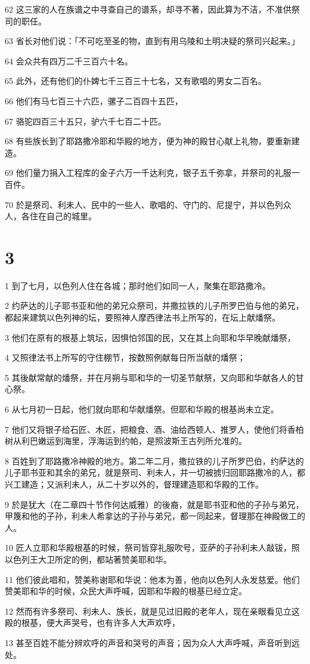 \par 62 这三家的人在族谱之中寻查自己的谱系，却寻不著，因此算为不洁，不准供祭司的职任。
\par 63 省长对他们说：「不可吃至圣的物，直到有用乌陵和土明决疑的祭司兴起来。」
\par 64 会众共有四万二千三百六十名。
\par 65 此外，还有他们的仆婢七千三百三十七名，又有歌唱的男女二百名。
\par 66 他们有马七百三十六匹，骡子二百四十五匹，
\par 67 骆驼四百三十五只，驴六千七百二十匹。
\par 68 有些族长到了耶路撒冷耶和华殿的地方，便为神的殿甘心献上礼物，要重新建造。
\par 69 他们量力捐入工程库的金子六万一千达利克，银子五千弥拿，并祭司的礼服一百件。
\par 70 於是祭司、利未人、民中的一些人、歌唱的、守门的、尼提宁，并以色列众人，各住在自己的城里。

\chapter{3}

\par 1 到了七月，以色列人住在各城；那时他们如同一人，聚集在耶路撒冷。
\par 2 约萨达的儿子耶书亚和他的弟兄众祭司，并撒拉铁的儿子所罗巴伯与他的弟兄，都起来建筑以色列神的坛，要照神人摩西律法书上所写的，在坛上献燔祭。
\par 3 他们在原有的根基上筑坛，因惧怕邻国的民，又在其上向耶和华早晚献燔祭，
\par 4 又照律法书上所写的守住棚节，按数照例献每日所当献的燔祭；
\par 5 其後献常献的燔祭，并在月朔与耶和华的一切圣节献祭，又向耶和华献各人的甘心祭。
\par 6 从七月初一日起，他们就向耶和华献燔祭。但耶和华殿的根基尚未立定。
\par 7 他们又将银子给石匠、木匠，把粮食、酒、油给西顿人、推罗人，使他们将香柏树从利巴嫩运到海里，浮海运到约帕，是照波斯王古列所允准的。
\par 8 百姓到了耶路撒冷神殿的地方。第二年二月，撒拉铁的儿子所罗巴伯，约萨达的儿子耶书亚和其余的弟兄，就是祭司、利未人，并一切被掳归回耶路撒冷的人，都兴工建造；又派利未人，从二十岁以外的，督理建造耶和华殿的工作。
\par 9 於是犹大（在二章四十节作何达威雅）的後裔，就是耶书亚和他的子孙与弟兄，甲篾和他的子孙，利未人希拿达的子孙与弟兄，都一同起来，督理那在神殿做工的人。
\par 10 匠人立耶和华殿根基的时候，祭司皆穿礼服吹号，亚萨的子孙利未人敲钹，照以色列王大卫所定的例，都站著赞美耶和华。
\par 11 他们彼此唱和，赞美称谢耶和华说：他本为善，他向以色列人永发慈爱。他们赞美耶和华的时候，众民大声呼喊，因耶和华殿的根基已经立定。
\par 12 然而有许多祭司、利未人、族长，就是见过旧殿的老年人，现在亲眼看见立这殿的根基，便大声哭号，也有许多人大声欢呼，
\par 13 甚至百姓不能分辨欢呼的声音和哭号的声音；因为众人大声呼喊，声音听到远处。

